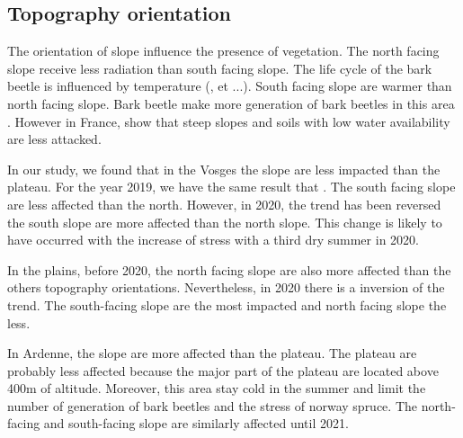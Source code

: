 \documentclass[3p,procedia]{elsarticle}
\begin{document}
\subsection{Topography orientation}


The orientation of slope influence the presence of vegetation. The north facing slope receive less radiation than south facing slope. 
The life cycle of the bark beetle is influenced by temperature (\cite{baier_phenipscomprehensive_2007}, et ...). South facing slope are warmer than north facing slope.
Bark beetle make more generation of bark beetles in this area \cite{}. 
However in France, \cite{nardi_drought_2022} show that steep slopes and soils with low water availability are less attacked. 

In our study, we found that in the Vosges the slope are less impacted than the plateau. 
For the year 2019, we have the same result that \cite{nardi_drought_2022}. 
The south facing slope are less affected than the north. 
However, in 2020, the trend has been reversed the south slope are more affected than the north slope. 
This change is likely to have occurred with the increase of stress with a third dry summer in 2020.

In the plains, before 2020, the north facing slope are also more affected than the others topography orientations. 
Nevertheless, in 2020 there is a inversion of the trend. 
The south-facing slope are the most impacted and north facing slope the less.

In Ardenne, the slope are more affected than the plateau. The plateau are probably less affected because the major part of the plateau are located above 400m of altitude.
Moreover, this area stay cold in the summer and limit the number of generation of bark beetles and the stress of norway spruce.
The north-facing and south-facing slope are similarly affected until 2021. 


 

\end{document}
